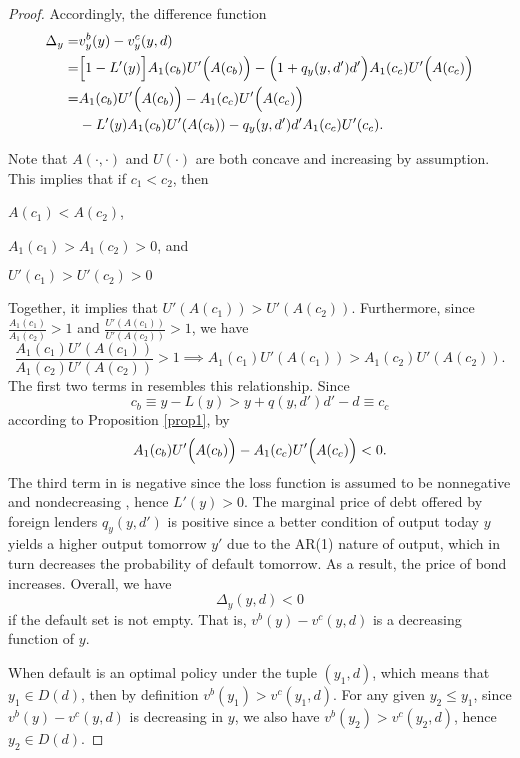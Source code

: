 \begin{proof}
    Accordingly, the difference function
    \begin{align}
        \Delta_y =& v^b_y(y) - v^c_y(y, d) \nonumber \\
        =& \Big[ 1 - L' (y)\Big] A_1 (c_b) U' \Bigl(A(c_b)\Bigr)-
            \Big(1 + q_y(y, d')d'\Big) A_1(c_c) U'\Big(A(c_c)\Big) \nonumber\\
        =& A_1 (c_b) U' \Bigl(A(c_b)\Bigr)-A_1 (c_c) U' \Bigl(A(c_c)\Bigr)  \nonumber \\
        & -L'(y) A_1(c_b)U'(A(c_b)) - q_y(y, d')d'A_1(c_c)U'(c_c). \label{eq:diff-value-function}
    \end{align}

    Note that $A(\cdot, \cdot)$ and $U(\cdot)$ are both concave and increasing by assumption. This implies that if $c_1<c_2$, then
    \begin{enumerate*}[label = (\roman*)]
        \item $A(c_1) < A(c_2)$,
        \item $A_1(c_1) > A_1(c_2)>0$, and
        \item $U'(c_1) > U'(c_2)>0$
    \end{enumerate*}
    Together, it implies that $U'(A(c_1)) > U'(A(c_2))$. Furthermore, since $\frac{A_1(c_1)}{A_1(c_2)} > 1$ and $\frac {U'(A(c_1))}{U'(A(c_2))} > 1$, we have
    \begin{equation}
        \label{eq:AUA-compare}
        \frac{A_1(c_1) U'(A(c_1))}{A_1(c_2) U'(A(c_2))} > 1 \implies
        {A_1(c_1) U'(A(c_1))} > {A_1(c_2) U'(A(c_2))}.
    \end{equation}
    The first two terms in  resembles this relationship. Since
    \begin{equation*}
        c_b \equiv y - L(y) > y+q(y, d')d' -d \equiv c_c
    \end{equation*}
    according to Proposition \ref{prop1}, by 
    \begin{equation*}
        A_1 (c_b) U' \Bigl(A(c_b)\Bigr) - A_1 (c_c) U' \Bigl(A(c_c)\Bigr) < 0.
    \end{equation*}
    The third term in  is negative since the loss function is assumed to be nonnegative and nondecreasing \citep{Na-18}, hence $L'(y) > 0$. The marginal price of debt offered by foreign lenders $q_y(y, d')$ is positive since a better condition of output today $y$ yields a higher output tomorrow $y'$ due to the AR(1) nature of output, which in turn decreases the probability of default tomorrow. As a result, the price of bond increases.
    Overall, we have
    \begin{equation*}
        \Delta_y (y, d) < 0
    \end{equation*}
    if the default set is not empty. That is, $v^b(y) - v^c(y, d)$ is a decreasing function of $y$.

    When default is an optimal policy under the tuple $(y_1, d)$, which means that $y_1 \in D(d)$, then by definition $v^b(y_1) > v^c(y_1, d)$. For any given $y_2 \le y_1$, since $v^b(y) - v^c(y, d)$ is decreasing in $y$, we also have $v^b(y_2) > v^c(y_2, d)$, hence $y_2 \in D(d)$.
\end{proof}

